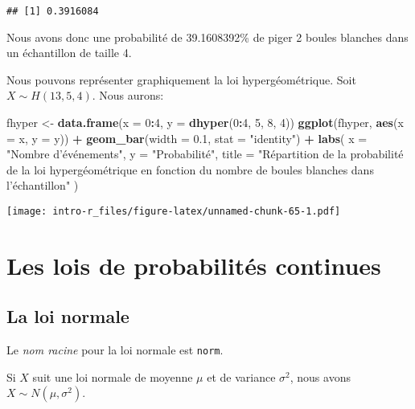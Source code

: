\documentclass[]{book}
\newenvironment{Shaded}{\begin{snugshade}}{\end{snugshade}}
\newcommand{\KeywordTok}[1]{\textcolor[rgb]{0.13,0.29,0.53}{\textbf{#1}}}
\newcommand{\DataTypeTok}[1]{\textcolor[rgb]{0.13,0.29,0.53}{#1}}
\newcommand{\DecValTok}[1]{\textcolor[rgb]{0.00,0.00,0.81}{#1}}
\newcommand{\FloatTok}[1]{\textcolor[rgb]{0.00,0.00,0.81}{#1}}
\newcommand{\StringTok}[1]{\textcolor[rgb]{0.31,0.60,0.02}{#1}}
\newcommand{\OperatorTok}[1]{\textcolor[rgb]{0.81,0.36,0.00}{\textbf{#1}}}
\newcommand{\NormalTok}[1]{#1}
\begin{document}
\begin{verbatim}
## [1] 0.3916084
\end{verbatim}

Nous avons donc une probabilité de 39.1608392\% de piger 2 boules
blanches dans un échantillon de taille 4.

Nous pouvons représenter graphiquement la loi hypergéométrique. Soit
\(X\sim H(13,5,4)\). Nous aurons:

\begin{Shaded}
\begin{Highlighting}[]
\NormalTok{fhyper <-}\StringTok{ }\KeywordTok{data.frame}\NormalTok{(}\DataTypeTok{x =} \DecValTok{0}\OperatorTok{:}\DecValTok{4}\NormalTok{, }\DataTypeTok{y =} \KeywordTok{dhyper}\NormalTok{(}\DecValTok{0}\OperatorTok{:}\DecValTok{4}\NormalTok{, }\DecValTok{5}\NormalTok{, }\DecValTok{8}\NormalTok{, }\DecValTok{4}\NormalTok{))}
\KeywordTok{ggplot}\NormalTok{(fhyper, }\KeywordTok{aes}\NormalTok{(}\DataTypeTok{x =}\NormalTok{ x, }\DataTypeTok{y =}\NormalTok{ y)) }\OperatorTok{+}
\StringTok{  }\KeywordTok{geom_bar}\NormalTok{(}\DataTypeTok{width =} \FloatTok{0.1}\NormalTok{, }\DataTypeTok{stat =} \StringTok{"identity"}\NormalTok{) }\OperatorTok{+}
\StringTok{  }\KeywordTok{labs}\NormalTok{(}
    \DataTypeTok{x =} \StringTok{"Nombre d'événements"}\NormalTok{,}
    \DataTypeTok{y =} \StringTok{"Probabilité"}\NormalTok{,}
    \DataTypeTok{title =} \StringTok{"Répartition de la probabilité de la loi hypergéométrique en fonction du nombre de boules blanches dans l'échantillon"}
\NormalTok{  )}
\end{Highlighting}
\end{Shaded}

\texttt{[image: intro-r\_files/figure-latex/unnamed-chunk-65-1.pdf]}

\section{Les lois de probabilités
continues}\label{les-lois-de-probabilites-continues}

\subsection{La loi normale}\label{la-loi-normale}

Le \emph{nom racine} pour la loi normale est \texttt{norm}.

Si \(X\) suit une loi normale de moyenne \(\mu\) et de variance
\(\sigma^2\), nous avons \(X\sim N(\mu,\sigma^2)\).
\end{document}
